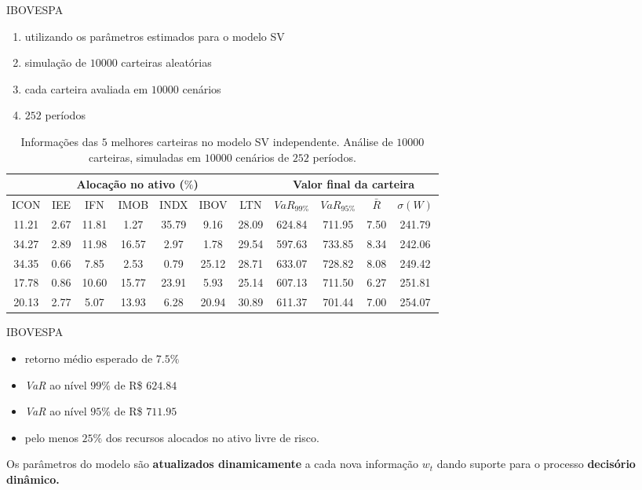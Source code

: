 \documentclass{beamer}
\begin{document}
\begin{frame}{IBOVESPA}



\begin{enumerate}
\item utilizando os parâmetros estimados para o modelo SV
\pause
\item simulação de $10000$ carteiras aleatórias
\pause
\item cada carteira avaliada em $10000$ cenários
\pause
\item $252$ períodos
\end{enumerate}


\begin{table}[ht]
\centering
\tiny
\begin{tabular}{ccccccc|cccc}
   \hline
  \hline
 \multicolumn{7}{c|}{Alocação no ativo ($\%$)} &  \multicolumn{4}{c}{Valor final da carteira}\\
 \hline
ICON & IEE & IFN & IMOB & INDX & IBOV & LTN & $VaR_{99\%}$ & $VaR_{95\%}$ & $\bar{R}$  & $\sigma(W)$ \\ 
  \hline
11.21 & 2.67 & 11.81 & 1.27 & 35.79 & 9.16 & 28.09 & 624.84 & 711.95 & 7.50 & 241.79 \\ 
  34.27 & 2.89 & 11.98 & 16.57 & 2.97 & 1.78 & 29.54 & 597.63 & 733.85 & 8.34 & 242.06 \\ 
  34.35 & 0.66 & 7.85 & 2.53 & 0.79 & 25.12 & 28.71 & 633.07 & 728.82 & 8.08 & 249.42 \\ 
  17.78 & 0.86 & 10.60 & 15.77 & 23.91 & 5.93 & 25.14 & 607.13 & 711.50 & 6.27 & 251.81 \\ 
  20.13 & 2.77 & 5.07 & 13.93 & 6.28 & 20.94 & 30.89 & 611.37 & 701.44 & 7.00 & 254.07 \\ 
   \hline
      \hline
\end{tabular}
      \caption{\scriptsize{Informações das $5$ melhores carteiras no modelo SV independente. Análise de $10000$ carteiras, simuladas em $10000$ cenários de $252$ períodos.}}
\label{tab:carteirasim}
\end{table}

\end{frame}


 \begin{frame}{IBOVESPA}


\begin{itemize}
\item retorno médio esperado de $7.5\%$
\item \textit{VaR} ao nível $99\%$  de R\$ $624.84$
\item \textit{VaR} ao nível $95\%$ de R\$ $711.95$
\item pelo menos $25\%$ dos recursos alocados no ativo livre de risco.
\end{itemize}

\vspace{.5cm}


Os parâmetros do modelo são \textbf{atualizados dinamicamente} a cada nova informação $w_t$ dando suporte para o processo \textbf{decisório dinâmico.}


\end{frame}
\end{document}
